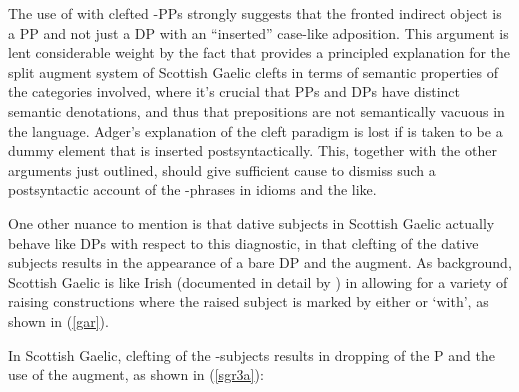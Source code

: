 \documentclass[output=paper,colorlinks,citecolor=brown]{langscibook}
\begin{document}
The use of  with clefted -PPs strongly suggests that the fronted indirect object is a PP and not just a DP with an ``inserted'' case-like adposition. This argument is lent considerable weight by the fact that \citet{gt:Adger:2011} provides a principled explanation for the split augment system of Scottish Gaelic clefts in terms of semantic properties of the categories involved, where it's crucial that PPs and DPs have distinct semantic denotations, and thus that prepositions are not semantically vacuous in the language. Adger's explanation of the cleft paradigm is lost if  is taken to be a dummy element that is inserted postsyntactically. This, together with the other arguments just outlined, should give 
sufficient cause to dismiss such a postsyntactic account of the -phrases in idioms and the like. 

One other nuance to mention is that dative subjects in Scottish Gaelic actually behave like DPs with respect to this diagnostic, in that clefting of the dative subjects results in the appearance of a bare DP and the  augment. As background, Scottish Gaelic is like Irish (documented in detail by \citealt{gt:McCloskey:1984}) in allowing for a variety of raising constructions where the raised subject is marked by either  or  `with', as shown in (\ref{gar}). 


\noindent In Scottish Gaelic, clefting of the -subjects results in dropping of the P and the use of the  augment, as shown in (\ref{sgr3a}): 

\end{document}
